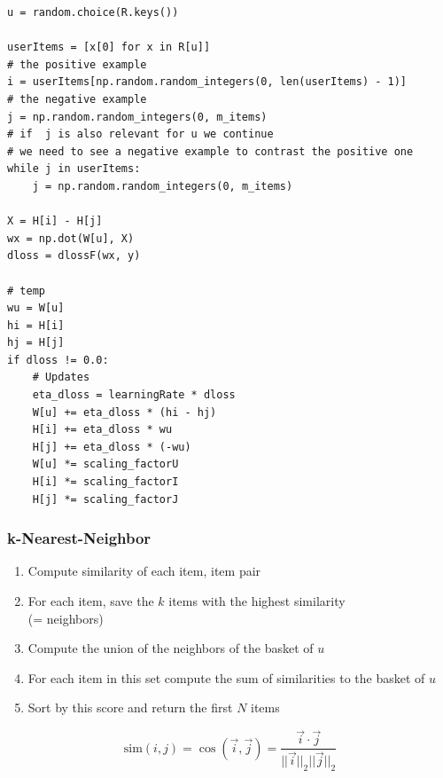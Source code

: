 \documentclass[mathserif,svgnames]{beamer}
\begin{document}
\begin{frame}[fragile]
\beamertemplatenavigationsymbolsempty
\begin{lstlisting}[style=python]
u = random.choice(R.keys())

userItems = [x[0] for x in R[u]]
# the positive example
i = userItems[np.random.random_integers(0, len(userItems) - 1)]
# the negative example
j = np.random.random_integers(0, m_items)
# if  j is also relevant for u we continue
# we need to see a negative example to contrast the positive one
while j in userItems:
    j = np.random.random_integers(0, m_items)

X = H[i] - H[j]
wx = np.dot(W[u], X)
dloss = dlossF(wx, y)

# temp
wu = W[u]
hi = H[i]
hj = H[j]
if dloss != 0.0:
    # Updates
    eta_dloss = learningRate * dloss
    W[u] += eta_dloss * (hi - hj)
    H[i] += eta_dloss * wu
    H[j] += eta_dloss * (-wu)
    W[u] *= scaling_factorU
    H[i] *= scaling_factorI
    H[j] *= scaling_factorJ
\end{lstlisting}
\end{frame}
\begin{frame}
\frametitle{k-Nearest-Neighbor~\cite{Karypis:2001:EIT:502585.502627}}
\begin{enumerate}
    \item Compute similarity of each item, item pair
    \item For each item, save the $k$ items with the highest similarity\\(= neighbors)
    \item Compute the union of the neighbors of the basket of $u$
    \item For each item in this set compute the sum of similarities to the basket of $u$
    \item Sort by this score and return the first $N$ items
\end{enumerate}
\begin{equation}
    \text{sim}(i,j) = \cos(\vec{i}, \vec{j})=\frac{\vec{i} \cdot \vec{j}}{||\vec{i}||_{2} ||\vec{j}||_{2}}
\end{equation}
\end{frame}
\end{document}

